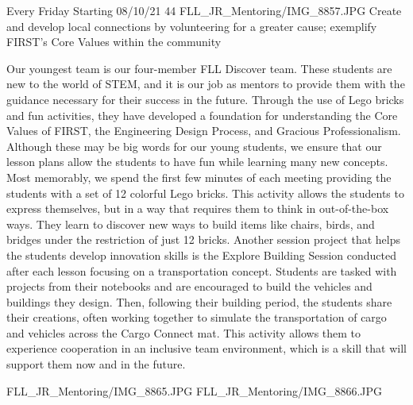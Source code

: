 {Every Friday Starting 08/10/21}
{44}
{FLL_JR_Mentoring/IMG_8857.JPG}
{Create and develop local connections by volunteering for a greater cause; exemplify FIRST's Core Values within the community} 
{Our youngest team is our four-member FLL Discover team. These students are new to the world of STEM, and it is our job as mentors to provide them with the guidance necessary for their success in the future. Through the use of Lego bricks and fun activities, they have developed a foundation for understanding the Core Values of FIRST, the Engineering Design Process, and Gracious Professionalism. Although these may be big words for our young students, we ensure that our lesson plans allow the students to have fun while learning many new concepts. Most memorably, we spend the first few minutes of each meeting providing the students with a set of 12 colorful Lego bricks. This activity allows the students to express themselves, but in a way that requires them to think in out-of-the-box ways. They learn to discover new ways to build items like chairs, birds, and bridges under the restriction of just 12 bricks. Another session project that helps the students develop innovation skills is the Explore Building Session conducted after each lesson focusing on a transportation concept. Students are tasked with projects from their notebooks and are encouraged to build the vehicles and buildings they design. Then, following their building period, the students share their creations, often working together to simulate the transportation of cargo and vehicles across the Cargo Connect mat. This activity allows them to experience cooperation in an inclusive team environment, which is a skill that will support them now and in the future.

} 
{FLL_JR_Mentoring/IMG_8865.JPG}
{FLL_JR_Mentoring/IMG_8866.JPG}

